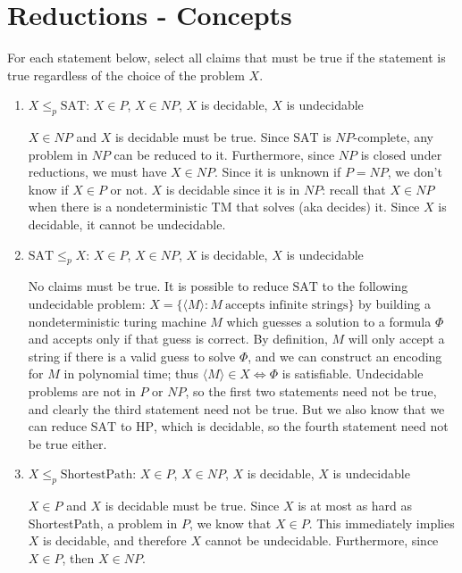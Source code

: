 \documentclass[fleqn]{article}
\begin{document}
\section{Reductions - Concepts}
For each statement below, select all claims that must be true if the statement is true regardless of the choice of the problem $X$.
\begin{enumerate}
    \item $X \leq_p \text{SAT}$: $X \in P$, $X \in NP$, $X$ is decidable, $X$ is undecidable
    \begin{answer}
        $X \in NP$ and $X$ is decidable must be true. Since $\text{SAT}$ is $NP$-complete, any problem
        in $NP$ can be reduced to it. Furthermore, since $NP$ is closed under reductions,
        we must have $X \in NP$. Since it is unknown if $P = NP$, we don't know if $X \in P$ or not.
        $X$ is decidable since it is in $NP$: recall that $X \in NP$ when there is a nondeterministic TM that
        solves (aka decides) it. Since $X$ is decidable, it cannot be undecidable.
    \end{answer}
    \item $\text{SAT} \leq_p X$: $X \in P$, $X \in NP$, $X$ is decidable, $X$ is undecidable
    \begin{answer}
        No claims must be true. It is possible to reduce $\text{SAT}$ to the following undecidable problem: $X = \{ \langle M \rangle : M~\text{accepts infinite strings}\}$ by building a nondeterministic turing machine $M$ which guesses a solution to a formula $\Phi$ and accepts only if that guess is correct. By definition, $M$ will only accept a string if there is a valid guess to solve $\Phi$, and we can construct an encoding for $M$ in polynomial time; thus $\langle M \rangle \in X \iff \Phi$ is satisfiable. Undecidable problems are not in $P$ or $NP$, so the first two statements need not be true, and clearly the third statement need not be true. But we also know that we can reduce $\text{SAT}$ to $\text{HP}$, which is decidable, so the fourth statement need not be true either.
    \end{answer}
    \item $X \leq_p \text{ShortestPath}$: $X \in P$, $X \in NP$, $X$ is decidable, $X$ is undecidable
    \begin{answer}
        $X \in P$ and $X$ is decidable must be true. Since $X$ is at most as hard as ShortestPath, a problem in $P$, we know that $X \in P$. This immediately implies $X$ is decidable, and therefore $X$ cannot be undecidable. Furthermore, since $X \in P$, then $X \in NP$.

\end{answer}
\end{enumerate}
\end{document}
